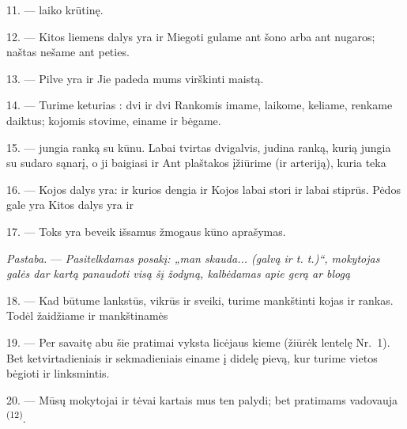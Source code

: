 11. ---  laiko krūtinę.

12. --- Kitos liemens dalys yra    ir
 Miegoti gulame ant šono arba ant nugaros; naštas nešame ant peties.

13. --- Pilve yra  ir  Jie padeda mums virškinti
maistą.

\VUsaut{4.4mm}
\VUsaut{3.0mm}

14. --- Turime keturias : dvi  ir dvi 
Rankomis imame, laikome, keliame, renkame daiktus; kojomis stovime, einame ir bėgame.

15. ---  jungia ranką su kūnu. Labai tvirtas 
dvigalvis, judina ranką, kurią  jungia su 
 sudaro  sąnarį, o ji baigiasi  ir
 Ant plaštakos įžiūrime  (ir arteriją), kuria teka

16. --- Kojos dalys yra:   ir 
 kurios  dengia   ir
 Kojos  labai stori ir labai stiprūs. Pėdos gale yra
 Kitos dalys yra  ir 

17. --- Toks yra beveik išsamus žmogaus kūno aprašymas.

\textit{Pastaba.} --- \textit{Pasitelkdamas posakį: „man skauda... (galvą ir
t. t.)“, mokytojas galės dar kartą panaudoti visą šį žodyną, kalbėdamas apie gerą ar
blogą} 

\VUsaut{5.0mm}
\VUsaut{2.4mm}
\VUsaut{3.0mm}

18. --- Kad būtume lankstūs, vikrūs ir sveiki, turime mankštinti kojas ir rankas.
Todėl žaidžiame ir mankštinamės 

19. --- Per savaitę abu šie pratimai vyksta licėjaus kieme (žiūrėk lentelę
Nr.~1). Bet ketvirtadieniais ir sekmadieniais einame į didelę pievą, kur turime
vietos bėgioti ir linksmintis.

20. --- Mūsų mokytojai ir tėvai kartais mus ten palydi; bet pratimams vadovauja
 \textsuperscript{(12)}.

